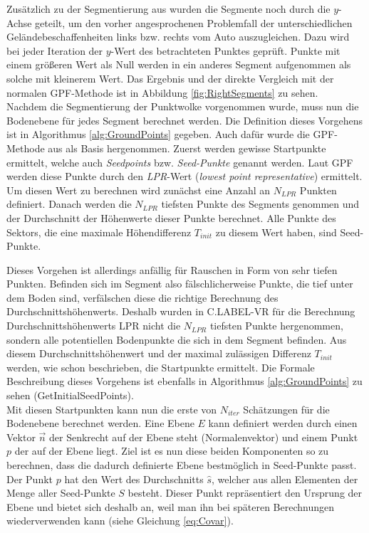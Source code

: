 Zusätzlich zu der Segmentierung aus \cite{bib:Segmentation1} wurden die Segmente noch durch die $y$-Achse geteilt, um den vorher angesprochenen Problemfall der unterschiedlichen Geländebeschaffenheiten links bzw. rechts vom Auto auszugleichen. Dazu wird bei jeder Iteration der $y$-Wert des betrachteten Punktes geprüft. Punkte mit einem größeren Wert als Null werden in ein anderes Segment aufgenommen als solche mit kleinerem Wert. Das Ergebnis und der direkte Vergleich mit der normalen GPF-Methode ist in Abbildung \ref{fig:RightSegments} zu sehen.\\

Nachdem die Segmentierung der Punktwolke vorgenommen wurde, muss nun die Bodenebene für jedes Segment berechnet werden. Die Definition dieses Vorgehens ist in Algorithmus \ref{alg:GroundPoints} gegeben. Auch dafür wurde die GPF-Methode aus \cite{bib:Segmentation1} als Basis hergenommen. Zuerst werden gewisse Startpunkte ermittelt, welche auch \textit{Seedpoints} bzw. \textit{Seed-Punkte} genannt werden. Laut GPF werden diese Punkte durch den \textit{LPR}-Wert (\textit{lowest point representative}) ermittelt. Um diesen Wert zu berechnen wird zunächst eine Anzahl an  $N_{LPR}$ Punkten definiert. Danach werden die $N_{LPR}$ tiefsten Punkte des Segments genommen und der Durchschnitt der Höhenwerte dieser Punkte berechnet. Alle Punkte des Sektors, die eine maximale Höhendifferenz $T_{init}$ zu diesem Wert haben, sind Seed-Punkte. 

Dieses Vorgehen ist allerdings anfällig für Rauschen in Form von sehr tiefen Punkten. Befinden sich im Segment also fälschlicherweise Punkte, die tief unter dem Boden sind, verfälschen diese die richtige Berechnung des Durchschnittshöhenwerts. Deshalb wurden in C.LABEL-VR für die Berechnung Durchschnittshöhenwerts LPR nicht die $N_{LPR}$ tiefsten Punkte hergenommen, sondern alle potentiellen Bodenpunkte die sich in dem Segment befinden. Aus diesem Durchschnittshöhenwert und der maximal zulässigen Differenz $T_{init}$ werden, wie schon beschrieben, die Startpunkte ermittelt. Die Formale Beschreibung dieses Vorgehens ist ebenfalls in Algorithmus \ref{alg:GroundPoints} zu sehen (GetInitialSeedPoints).\\

Mit diesen Startpunkten kann nun die erste von $N_{iter}$ Schätzungen für die Bodenebene berechnet werden. Eine Ebene $E$ kann definiert werden durch einen Vektor $\vec{n}$ der Senkrecht auf der Ebene steht (Normalenvektor) und einem Punkt $p$ der auf der Ebene liegt. Ziel ist es nun diese beiden Komponenten so zu berechnen, dass die dadurch definierte Ebene bestmöglich in Seed-Punkte passt. Der Punkt $p$ hat den Wert des Durchschnitts $\hat{s}$, welcher aus allen Elementen der Menge aller Seed-Punkte $S$ besteht. Dieser Punkt repräsentiert den Ursprung der Ebene und bietet sich deshalb an, weil man ihn bei späteren Berechnungen wiederverwenden kann (siehe Gleichung \ref{eq:Covar}).

